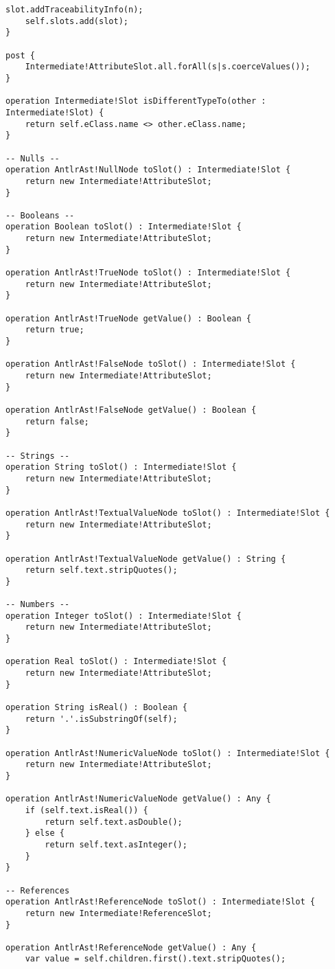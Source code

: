 \begin{lstlisting}[caption=Transforming AST models to intermediate models with ETL., label=lst:m2m_full, language=ETL]
	slot.addTraceabilityInfo(n);
	self.slots.add(slot);
}

post {
	Intermediate!AttributeSlot.all.forAll(s|s.coerceValues());
}

operation Intermediate!Slot isDifferentTypeTo(other : Intermediate!Slot) {
	return self.eClass.name <> other.eClass.name;
}

-- Nulls --
operation AntlrAst!NullNode toSlot() : Intermediate!Slot {
	return new Intermediate!AttributeSlot;
}

-- Booleans --
operation Boolean toSlot() : Intermediate!Slot {
	return new Intermediate!AttributeSlot;
}

operation AntlrAst!TrueNode toSlot() : Intermediate!Slot {
	return new Intermediate!AttributeSlot;
}

operation AntlrAst!TrueNode getValue() : Boolean {
	return true;
}

operation AntlrAst!FalseNode toSlot() : Intermediate!Slot {
	return new Intermediate!AttributeSlot;
}

operation AntlrAst!FalseNode getValue() : Boolean {
	return false;
}

-- Strings --
operation String toSlot() : Intermediate!Slot {
	return new Intermediate!AttributeSlot;
}

operation AntlrAst!TextualValueNode toSlot() : Intermediate!Slot {
	return new Intermediate!AttributeSlot;
}

operation AntlrAst!TextualValueNode getValue() : String {
	return self.text.stripQuotes();
}

-- Numbers --
operation Integer toSlot() : Intermediate!Slot {
	return new Intermediate!AttributeSlot;
}

operation Real toSlot() : Intermediate!Slot {
	return new Intermediate!AttributeSlot;
}

operation String isReal() : Boolean {
	return '.'.isSubstringOf(self);
}

operation AntlrAst!NumericValueNode toSlot() : Intermediate!Slot {
	return new Intermediate!AttributeSlot;
}

operation AntlrAst!NumericValueNode getValue() : Any {
	if (self.text.isReal()) {
		return self.text.asDouble();
	} else {
		return self.text.asInteger();
	}
}

-- References
operation AntlrAst!ReferenceNode toSlot() : Intermediate!Slot {
	return new Intermediate!ReferenceSlot;
}

operation AntlrAst!ReferenceNode getValue() : Any {
	var value = self.children.first().text.stripQuotes();
	

\end{lstlisting}
